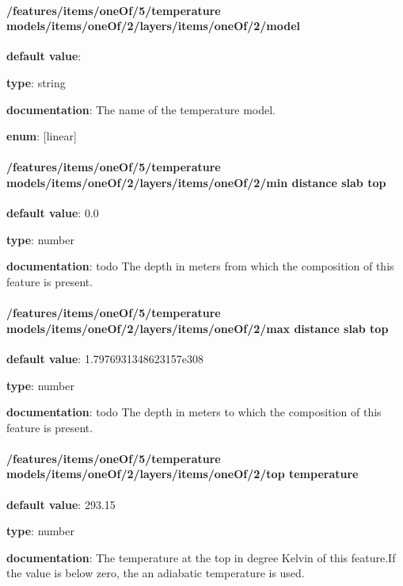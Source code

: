 \paragraph{/features/items/oneOf/5/temperature models/items/oneOf/2/layers/items/oneOf/2/model} \begin{itemized}
\item {\bf default value}: 
\item {\bf type}: string
\item {\bf documentation}: The name of the temperature model.
\item {\bf enum}: [linear]\end{itemized}\paragraph{/features/items/oneOf/5/temperature models/items/oneOf/2/layers/items/oneOf/2/min distance slab top} \begin{itemized}
\item {\bf default value}: 0.0
\item {\bf type}: number
\item {\bf documentation}: todo The depth in meters from which the composition of this feature is present.
\end{itemized}\paragraph{/features/items/oneOf/5/temperature models/items/oneOf/2/layers/items/oneOf/2/max distance slab top} \begin{itemized}
\item {\bf default value}: 1.7976931348623157e308
\item {\bf type}: number
\item {\bf documentation}: todo The depth in meters to which the composition of this feature is present.
\end{itemized}\paragraph{/features/items/oneOf/5/temperature models/items/oneOf/2/layers/items/oneOf/2/top temperature} \begin{itemized}
\item {\bf default value}: 293.15
\item {\bf type}: number
\item {\bf documentation}: The temperature at the top in degree Kelvin of this feature.If the value is below zero, the an adiabatic temperature is used.

\end{itemized}
